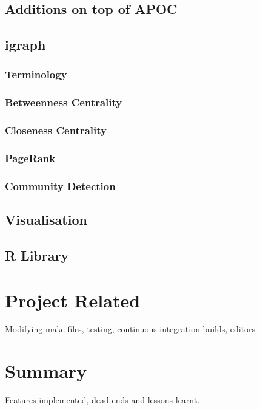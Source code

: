 \subsection{Additions on top of APOC}

\subsection{igraph}

\subsubsection{Terminology}

\subsubsection{Betweenness Centrality}

\subsubsection{Closeness Centrality}

\subsubsection{PageRank}

\subsubsection{Community Detection}

\subsection{Visualisation}

\subsection{R Library}

\section{Project Related}
Modifying make files, testing, continuous-integration builds, editors

\section{Summary}
Features implemented, dead-ends and lessons learnt.
